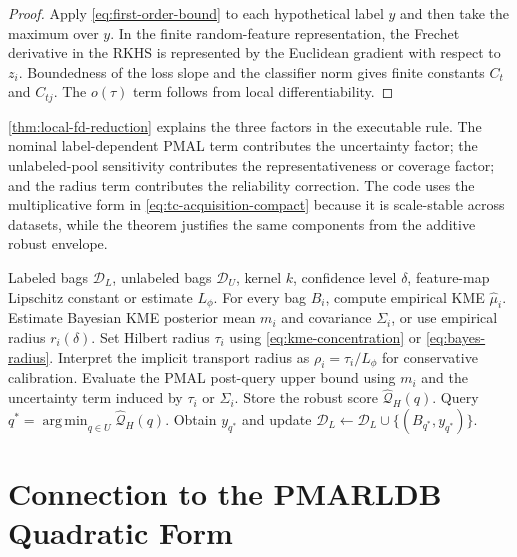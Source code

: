 \documentclass[10pt,journal]{IEEEtran}
\DeclareMathOperator*{\argmin}{arg\,min}
\newcommand{\Dcal}{\mathcal{D}}
\newcommand{\wh}{\widehat}
\begin{document}
\begin{proof}
Apply \eqref{eq:first-order-bound} to each hypothetical label $y$ and then take the maximum over $y$. In the finite random-feature representation, the Frechet derivative in the RKHS is represented by the Euclidean gradient with respect to $z_i$. Boundedness of the loss slope and the classifier norm gives finite constants $C_t$ and $C_{tj}$. The $o(\tau)$ term follows from local differentiability.
\end{proof}

\cref{thm:local-fd-reduction} explains the three factors in the executable rule. The nominal label-dependent PMAL term contributes the uncertainty factor; the unlabeled-pool sensitivity contributes the representativeness or coverage factor; and the radius term contributes the reliability correction. The code uses the multiplicative form in \eqref{eq:tc-acquisition-compact} because it is scale-stable across datasets, while the theorem justifies the same components from the additive robust envelope.

\begin{algorithm}[t]
\caption{Transport-Calibrated Bayesian KME-PMAL}
\label{alg:tc-kme-pmal}
\begin{algorithmic}[1]
\REQUIRE Labeled bags $\Dcal_L$, unlabeled bags $\Dcal_U$, kernel $k$, confidence level $\delta$, feature-map Lipschitz constant or estimate $L_\phi$.
\STATE For every bag $B_i$, compute empirical KME $\wh\mu_i$.
\STATE Estimate Bayesian KME posterior mean $m_i$ and covariance $\Sigma_i$, or use empirical radius $r_i(\delta)$.
\STATE Set Hilbert radius $\tau_i$ using \eqref{eq:kme-concentration} or \eqref{eq:bayes-radius}.
\STATE Interpret the implicit transport radius as $\rho_i=\tau_i/L_\phi$ for conservative calibration.
    \STATE Evaluate the PMAL post-query upper bound using $m_i$ and the uncertainty term induced by $\tau_i$ or $\Sigma_i$.
    \STATE Store the robust score $\wh{\mathcal{Q}}_H(q)$.
\ENDFOR
\STATE Query $q^*=\argmin_{q\in U}\wh{\mathcal{Q}}_H(q)$.
\STATE Obtain $y_{q^*}$ and update $\Dcal_L\leftarrow \Dcal_L\cup\{(B_{q^*},y_{q^*})\}$.
\end{algorithmic}
\end{algorithm}

\section{Connection to the PMARLDB Quadratic Form}
\label{sec:quadratic}
\end{document}
